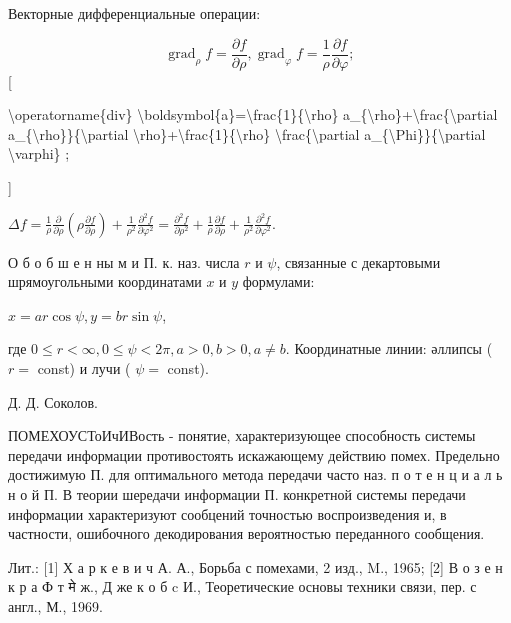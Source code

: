 \documentclass[10pt]{article}
\begin{document}
Векторные дифференциальные операции:



\[

\operatorname{grad}_{\rho} f=\frac{\partial f}{\partial \rho}, \operatorname{grad}_{\varphi} f=\frac{1}{\rho} \frac{\partial f}{\partial \varphi} ;

\][



\textbackslash operatorname\{div\} \textbackslash boldsymbol\{a\}=\textbackslash frac\{1\}\{\textbackslash rho\} a\_\{\textbackslash rho\}+\textbackslash frac\{\textbackslash partial a\_\{\textbackslash rho\}\}\{\textbackslash partial \textbackslash rho\}+\textbackslash frac\{1\}\{\textbackslash rho\} \textbackslash frac\{\textbackslash partial a\_\{\textbackslash Phi\}\}\{\textbackslash partial \textbackslash varphi\} ;

]



$\Delta f=\frac{1}{\rho} \frac{\partial}{\partial \rho}\left(\rho \frac{\partial f}{\partial \rho}\right)+\frac{1}{\rho^{2}} \frac{\partial^{2} f}{\partial \varphi^{2}}=\frac{\partial^{2} f}{\partial \rho^{2}}+\frac{1}{\rho} \frac{\partial f}{\partial \rho}+\frac{1}{\rho^{2}} \frac{\partial^{2} f}{\partial \varphi^{2}}$.



О б о б ш е н ны м и П. к. наз. числа $r$ и $\psi$, связанные с декартовыми шрямоугольными координатами $x$ и $y$ формулами:



$x=a r \cos \psi, y=b r \sin \psi$,



где $0 \leqslant r<\infty, 0 \leqslant \psi<2 \pi, a>0, b>0, a \neq b$. Координатные линии: әллипсы ( $r=$ const) и лучи ( $\psi=$ const).



Д. Д. Соколов.



ПОМЕХОУСТоИчИВость - понятие, характеризующее способность системы передачи информации противостоять искажающему действию помех. Предельно достижимую П. для оптимального метода передачи часто наз. п о т е н ц и а л ь н о й П. В теории шередачи информации П. конкретной системы передачи информации характеризуют сообцений точностью воспроизведения и, в частности, ошибочного декодирования вероятностью переданного сообщения.



Лит.: [1] Х а р к е в и ч А. А., Борьба с помехами, 2 изд., M., 1965; [2] В о з е н к р а Ф т मे ж., Д же к о б c И., Теоретические основы техники связи, пер. с англ., М., 1969.
\end{document}
